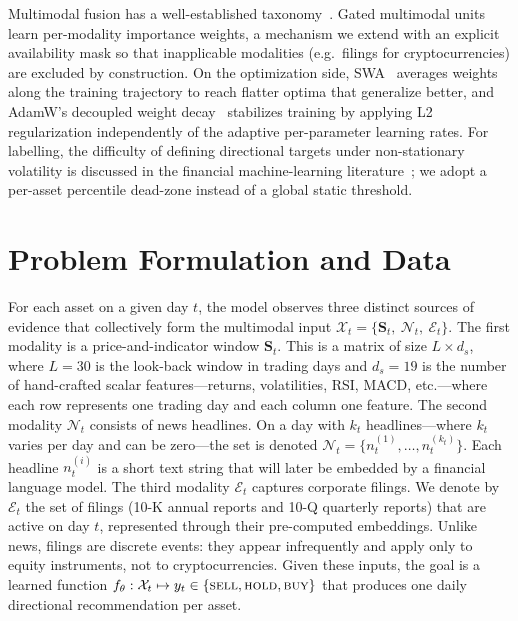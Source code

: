 \documentclass[runningheads]{llncs}
\begin{document}
Multimodal fusion has a well-established taxonomy~\cite{baltrusaitis2019}. Gated
multimodal units~\cite{arevalo2017} learn per-modality importance weights, a
mechanism we extend with an explicit availability mask so that inapplicable
modalities (e.g.\ filings for cryptocurrencies) are excluded by construction.
On the optimization side, SWA~\cite{izmailov2018} averages weights along the
training trajectory to reach flatter optima that generalize better, and
AdamW's decoupled weight decay~\cite{loshchilov2019} stabilizes training by
applying L2 regularization independently of the adaptive per-parameter learning
rates.
For labelling, the difficulty of defining directional targets under
non-stationary volatility is discussed in the financial machine-learning
literature~\cite{lopezdeprado2018}; we adopt a per-asset percentile dead-zone
instead of a global static threshold.

\section{Problem Formulation and Data}
For each asset on a given day $t$, the model observes three distinct sources
of evidence that collectively form the multimodal input
$\mathcal{X}_t = \{\mathbf{S}_t,\ \mathcal{N}_t,\ \mathcal{E}_t\}$. The first modality is a price-and-indicator window $\mathbf{S}_t$. This is a
matrix of size $L \times d_s$, where $L = 30$ is the look-back window in
trading days and $d_s = 19$ is the number of hand-crafted scalar
features---returns, volatilities, RSI,
MACD, etc.---where each row represents one trading day and each column one feature.
The second modality $\mathcal{N}_t$ consists of news headlines. On a day with $k_t$
headlines---where $k_t$ varies per day and can be zero---the set is denoted
$\mathcal{N}_t = \{n_t^{(1)}, \dots, n_t^{(k_t)}\}$. Each headline $n_t^{(i)}$
is a short text string that will later be embedded by a financial language
model. The third modality $\mathcal{E}_t$ captures corporate filings. We denote by $\mathcal{E}_t$ the
set of filings (10-K annual reports and 10-Q quarterly reports) that are active
on day $t$, represented through their pre-computed embeddings. Unlike news,
filings are discrete events: they appear infrequently and apply only to equity
instruments, not to cryptocurrencies. Given these inputs, the goal is a learned function
$f_\theta : \mathcal{X}_t \mapsto y_t \in
\{\textsc{sell},\textsc{hold},\textsc{buy}\}$ that produces one daily
directional recommendation per asset.
\end{document}
